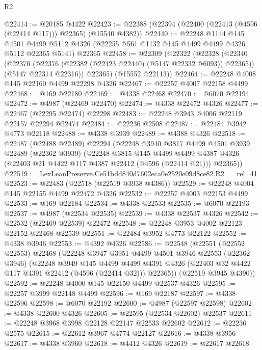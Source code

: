 \begin{lexlean}{R2}
\begin{coremodule}
@22414 := @20185 @4422
@22423 := @22388 (@22394 (@22400 (@22413 (@4596 (@22414 @117))) @22365) (@15540 @4382))
@22440 := @22248
    @1144
    @145
    @4501
    @4499
    @5112
    @4326
    (@22255 @561 @1132 @145 @4499 @4499 @4326 @5112 @22365 @5141)
    @22365
@22458 := @22309
    (@22322
      (@22328
        (@22340
          (@22370 (@22376 (@22382 (@22423 @22440) (@5147 @22332 @6093)) @22365))
          (@5147 @22314 @22316))
        @22365)
      (@15552 @22113))
@22464 := @22248 @4008 @145 @22160 @4499 @22298 @4326
@22467 := @22257 @4007 @22158 @4499
@22468 := @169 @22180
@22469 := @4338 @22468
@22470 := @6070 @22194
@22472 := @4987 (@22469 @22470)
@22474 := @4338 @22472 @4326
@22477 := @22467 (@22295 @22474) @22298
@22483 := @22248 @3943 @4006 @22119 @22157 @22294 @22474
@22484 := @22236 @2508
@22487 := @22484 @3942 @4773 @22118
@22488 := @4338 @3939
@22489 := @4388 @4326
@22518 := @22487
    (@22488 @22489)
    @22294
    (@22248
      @3940
      @3817
      @4499
      @4501
      @3939
      @22489
      (@22362 @3939)
      (@22248
        @3815
        @145
        @4499
        @4499
        @4387
        @4326
        (@22403 @21 @4422 @117 @4387 @22412 (@4596 (@22414 @21)))
        @22365))
@22519 := LexLeanPreserve.Ce51bdd840d7602eca0e2520e09d8ce82.R2.__rel_41
@22523 := @22483 (@22518 (@22519 @3938 @4386))
@22529 := @22248 @4004 @145 @22155 @4499 @22472 @4326
@22532 := @22257 @4003 @22153 @4499
@22533 := @169 @22184
@22534 := @4338 @22533
@22535 := @6070 @22193
@22537 := @4987 (@22534 @22535)
@22539 := @4338 @22537 @4326
@22542 := @22532 (@22469 @22539) @22472
@22548 := @22248 @3953 @4002 @22123 @22152 @22468 @22539
@22551 := @22484 @3952 @4773 @22122
@22552 := @4338 @3946
@22553 := @4392 @4326
@22586 := @22548
    (@22551
      (@22552 @22553)
      @22468
      (@22248
        @3947
        @3951
        @4499
        @4501
        @3946
        @22553
        (@22362 @3946)
        (@22248
          @3949
          @145
          @4499
          @4499
          @4391
          @4326
          (@22403 @32 @4422 @117 @4391 @22412 (@4596 (@22414 @32)))
          @22365))
      (@22519 @3945 @4390))
@22592 := @22248 @4000 @145 @22150 @4499 @22537 @4326
@22595 := @22257 @3999 @22148 @4499
@22596 := @169 @22187
@22597 := @4338 @22596
@22598 := @6070 @22192
@22600 := @4987 (@22597 @22598)
@22602 := @4338 @22600 @4326
@22605 := @22595 (@22534 @22602) @22537
@22611 := @22248 @3968 @3998 @22128 @22147 @22533 @22602
@22612 := @22236 @2575
@22615 := @22612 @3967 @4774 @22127
@22616 := @4338 @3956
@22617 := @4338 @3960
@22618 := @4412 @4326
@22619 := @22617 @22618

\end{coremodule}
\end{lexlean}
